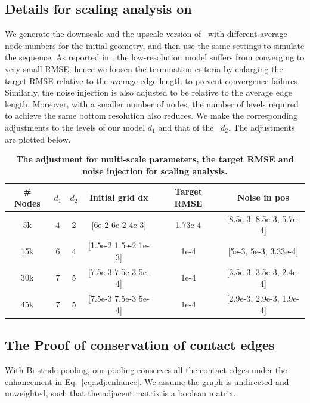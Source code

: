 \subsection{Details for scaling analysis on \fonts}
\label{sec:appdx:scale}
We generate the downscale and the upscale version of \fonts~with different average node numbers for the initial geometry, and then use the same settings to simulate the sequence. As reported in \citet{fortunato2022multiscale}, the low-resolution model suffers from converging to very small RMSE; hence we loosen the termination criteria by enlarging the target RMSE relative to the average edge length to prevent convergence failures. Similarly, the noise injection is also adjusted to be relative to the average edge length. Moreover, with a smaller number of nodes, the number of levels required to achieve the same bottom resolution also reduces. We make the corresponding adjustments to the levels of our model $d_1$ and that of the \linoGNN~$d_2$. The adjustments are plotted below.

\begin{table}[h]
    \centering
    \caption{\textbf{The adjustment for multi-scale parameters, the target RMSE and noise injection for scaling analysis.}}
    \label{tab:scale:model:detail}
    \begin{tabular}{cccccc}
        \textbf{\# Nodes} & $d_1$ & $d_2$ & \textbf{Initial grid dx} & \textbf{Target RMSE} & \textbf{Noise in pos}        \\ \hline
        5k                & 4     & 2     & {[}6e-2 6e-2 4e-3{]}     & 1.73e-4              & {[}8.5e-3, 8.5e-3, 5.7e-4{]} \\
        15k               & 6     & 4     & {[}1.5e-2 1.5e-2 1e-3{]} & 1e-4                 & {[}5e-3, 5e-3, 3.33e-4{]}    \\
        30k               & 7     & 5     & {[}7.5e-3 7.5e-3 5e-4{]} & 1e-4                 & {[}3.5e-3, 3.5e-3, 2.4e-4{]} \\
        45k               & 7     & 5     & {[}7.5e-3 7.5e-3 5e-4{]} & 1e-4                 & {[}2.9e-3, 2.9e-3, 1.9e-4{]}
    \end{tabular}
\end{table}

\subsection{The Proof of conservation of contact edges}
\label{sec:appdx:prove:contact:conserve}
With Bi-stride pooling, our pooling conserves all the contact edges under the enhancement in Eq.~\ref{eq:adj:enhance}. We assume the graph is undirected and unweighted, such that the adjacent matrix is a boolean matrix.

